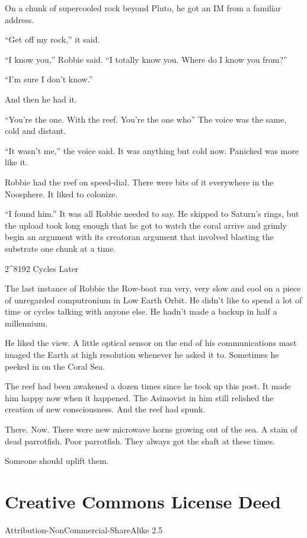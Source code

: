 On a chunk of supercooled rock beyond Pluto, he got an IM from a
familiar address.

“Get off my rock,” it said.

“I know you,” Robbie said. “I totally know you. Where do I know you
from?”

“I’m sure I don’t know.”

And then he had it.

“You’re the one. With the reef. You’re the one who\dash{}” The voice was
the same, cold and distant.

“It wasn’t me,” the voice said. It was anything but cold now.
Panicked was more like it.

Robbie had the reef on speed-dial. There were bits of it everywhere
in the Noosphere. It liked to colonize.

“I found him.” It was all Robbie needed to say. He skipped to
Saturn’s rings, but the upload took long enough that he got to
watch the coral arrive and grimly begin an argument with its
creator\dash{}an argument that involved blasting the substrate one chunk
at a time.

\tb

2\^{}8192 Cycles Later

The last instance of Robbie the Row-boat ran very, very slow and
cool on a piece of unregarded computronium in Low Earth Orbit. He
didn’t like to spend a lot of time or cycles talking with anyone
else. He hadn’t made a backup in half a millennium.

He liked the view. A little optical sensor on the end of his
communications mast imaged the Earth at high resolution whenever he
asked it to. Sometimes he peeked in on the Coral Sea.

The reef had been awakened a dozen times since he took up this
post. It made him happy now when it happened. The Asimovist in him
still relished the creation of new consciousness. And the reef had
spunk.

There. Now. There were new microwave horns growing out of the sea.
A stain of dead parrotfish. Poor parrotfish. They always got the
shaft at these times.

Someone should uplift them.

\section{Creative Commons License Deed}

Attribution-NonCommercial-ShareAlike 2.5

